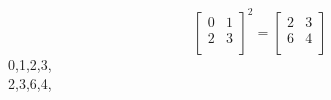 $$
{
\left[
\begin{array}{*{2}{r}}
0 & 1\\
2 & 3\\
\end{array}
\right]
}^{2}
=
\left[
\begin{array}{*{2}{r}}
2 & 3\\
6 & 4\\
\end{array}
\right]
$$
0,1,2,3,\\
2,3,6,4,\\
